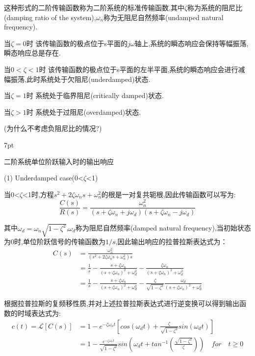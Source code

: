 \documentclass{article}
\numberwithin{equation}{section}
\numberwithin{figure}{section}
\newenvironment{formal}{%
\def\FrameCommand{%
\hspace{1pt}%
{\color{DarkBlue}\vrule width 2pt}%
{\color{formalshade}\vrule width 4pt}%
\colorbox{formalshade}%
}%
\MakeFramed{\advance\hsize-\width\FrameRestore}%
\noindent\hspace{-4.55pt}%
\begin{adjustwidth}{}{7pt}%
\vspace{2pt}\vspace{2pt}%
}
{%
\vspace{2pt}\end{adjustwidth}\endMakeFramed%
}
\begin{document}
这种形式的二阶传输函数称为二阶系统的标准传输函数,其中$\zeta$称为系统的阻尼比(damping ratio of the system),$\omega _n$称为无阻尼自然频率(undamped natural frequency).

当$\zeta = 0$时 该传输函数的极点位于s平面的$j\omega$轴上,系统的瞬态响应会保持等幅振荡,瞬态响应总是存在.

当$0<\zeta < 1$时 该传输函数的极点位于s平面的左半平面,系统的瞬态响应会进行减幅振荡,此时系统处于欠阻尼(underdamped)状态.

当$\zeta = 1$时 系统处于临界阻尼(critically damped)状态.

当$\zeta > 1$时 系统处于过阻尼(overdamped)状态.

(为什么不考虑负阻尼比的情况?)

\begin{formal}
    二阶系统单位阶跃输入时的输出响应
\end{formal}
(1) Underdamped case(0<$\zeta$<1)

当0<$\zeta$<1时,方程$s^2+2\zeta \omega _ns+\omega _n^2$的根是一对复共轭根,因此传输函数可以写为:
\begin{equation}
    \frac{C(s)}{R(s)}=\frac{\omega _n^2}{(s+\zeta \omega _n+j\omega _d)(s+\zeta \omega _n-j\omega _d)}
\end{equation}

其中$\omega_d=\omega_n \sqrt{1-\zeta ^2}$,$\omega_d$称为阻尼自然频率(damped natural frequency),当初始状态为0时,单位阶跃信号的传输函数为$1/s$,因此输出响应的拉普拉斯表达式为：
\begin{equation}
    \begin{split}
        C(s)&=\frac{\omega_n^2}{(s^2+2\zeta\omega_ns+\omega_n^2)s}\\
        &=\frac{1}{s}-\frac{s+\zeta\omega_n}{(s+\zeta\omega_n)^2+\omega_d^2}-\frac{\zeta\omega_n}{(s+\zeta\omega_n)^2+\omega_d^2}\\
        &=\frac{1}{s}-\frac{s+\zeta\omega_n}{(s+\zeta\omega_n)^2+\omega_d^2}-\frac{\zeta}{\sqrt{1-\zeta^2}}\frac{\omega_d}{(s+\zeta\omega_n)^2+\omega_d^2}
    \end{split}
\end{equation}

根据拉普拉斯的复频移性质,并对上述拉普拉斯表达式进行逆变换可以得到输出函数的时域表达式为:
\begin{equation}
    \begin{split}
        c(t)=\mathscr{L}[C(s)]&=1-e^{-\zeta\omega_nt}[cos(\omega_dt)+\frac{\zeta}{\sqrt{1-\zeta^2}}sin(\omega_dt)]\\
        &=1-\frac{e^{-\zeta\omega_nt}}{\sqrt{1-\zeta^2}}sin(\omega_dt+tan^{-1}(\frac{\sqrt{1-\zeta^2}}{\zeta})) \quad for \quad t≥0\label{underdampedoutputfunction}
    \end{split}
\end{equation}
\end{document}
